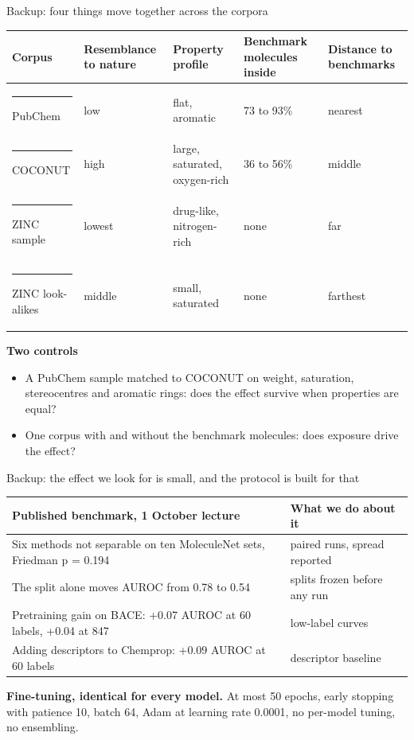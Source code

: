\documentclass[aspectratio=169,10pt]{beamer}
\newcommand{\muted}[1]{\textcolor{ink2}{#1}}
\newcommand{\sw}[1]{\textcolor{#1}{\rule[-0.1ex]{0.75em}{0.75em}}\hspace{0.4em}}
\begin{document}
\begin{frame}{Backup: four things move together across the corpora}
\small
\begin{tabular}{@{}L{31mm}L{24mm}L{31mm}L{23mm}L{21mm}@{}}
\toprule
\muted{Corpus} & \muted{Resemblance to nature} & \muted{Property profile} &
\muted{Benchmark molecules inside} & \muted{Distance to benchmarks}\\
\midrule
\sw{cPub}PubChem & low & flat, aromatic & 73 to 93\% & nearest\\[2pt]
\sw{cCoco}COCONUT & high & large, saturated, oxygen-rich & 36 to 56\% & middle\\[2pt]
\sw{cZinc}ZINC sample & lowest & drug-like, nitrogen-rich & none & far\\[2pt]
\sw{cZnp}ZINC look-alikes & middle & small, saturated & none & farthest\\
\bottomrule
\end{tabular}

\vspace{3mm}
\normalsize\textbf{Two controls}
\begin{itemize}
\setlength{\itemsep}{2mm}
\item A PubChem sample matched to COCONUT on weight, saturation, stereocentres
and aromatic rings: does the effect survive when properties are equal?
\item One corpus with and without the benchmark molecules: does exposure drive
the effect?
\end{itemize}
\end{frame}

\begin{frame}{Backup: the effect we look for is small, and the protocol is
built for that}
\begin{tabular}{@{}L{88mm}L{46mm}@{}}
\toprule
\muted{Published benchmark, 1 October lecture} & \muted{What we do about it}\\
\midrule
Six methods not separable on ten MoleculeNet sets, Friedman p = 0.194 &
paired runs, spread reported\\[3pt]
The split alone moves AUROC from 0.78 to 0.54 & splits frozen before any run\\[3pt]
Pretraining gain on BACE: +0.07 AUROC at 60 labels, +0.04 at 847 &
low-label curves\\[3pt]
Adding descriptors to Chemprop: +0.09 AUROC at 60 labels & descriptor baseline\\
\bottomrule
\end{tabular}

\vspace{6mm}
\textbf{Fine-tuning, identical for every model.} At most 50 epochs, early
stopping with patience 10, batch 64, Adam at learning rate 0.0001, no per-model
tuning, no ensembling.
\end{frame}
\end{document}
